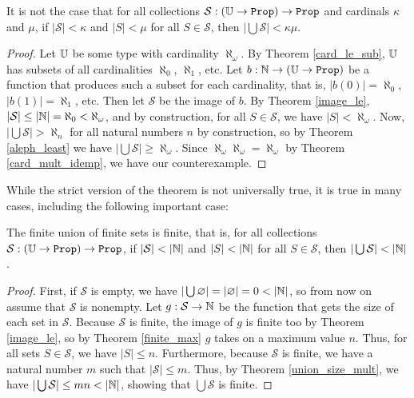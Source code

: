 \documentclass[../../math.tex]{subfiles}
\begin{document}
\begin{theorem}
    It is not the case that for all collections $\mathcal S : (\U \to \Prop) \to
    \Prop$ and cardinals $\kappa$ and $\mu$, if $|\mathcal S| < \kappa$ and $|S|
    < \mu$ for all $S \in \mathcal S$, then $|\bigcup \mathcal S| < \kappa\mu$.
\end{theorem}
\begin{proof}
    Let $\mathbb{U}$ be some type with cardinality $\aleph_\omega$.  By Theorem
    \ref{card_le_sub}, $\mathbb{U}$ has subsets of all cardinalities $\aleph_0$,
    $\aleph_1$, etc.  Let $b : \N \to (\U \to \Prop)$ be a function that
    produces such a subset for each cardinality, that is, $|b(0)| = \aleph_0$,
    $|b(1)| = \aleph_1$, etc.  Then let $\mathcal S$ be the image of $b$.  By
    Theorem \ref{image_le}, $|\mathcal S| \leq |\mathbb{N}| = \aleph_0 < \aleph_\omega$,
    and by construction, for all $S \in \mathcal S$, we have $|S| <
    \aleph_\omega$.  Now, $|\bigcup \mathcal S| > \aleph_n$ for all natural
    numbers $n$ by construction, so by Theorem \ref{aleph_least} we have
    $|\bigcup \mathcal S| \geq \aleph_\omega$.  Since $\aleph_\omega
    \aleph_\omega = \aleph_\omega$ by Theorem \ref{card_mult_idemp}, we have our
    counterexample.
\end{proof}

While the strict version of the theorem is not universally true, it is true in
many cases, including the following important case:

\begin{theorem} \label{finite_union_finite}
    The finite union of finite sets is finite, that is, for all collections
    $\mathcal S : (\U \to \Prop) \to \Prop$, if $|\mathcal S| < |\mathbb{N}|$ and $|S| <
    |\mathbb{N}|$ for all $S \in \mathcal S$, then $|\bigcup \mathcal S| < |\mathbb{N}|$.
\end{theorem}
\begin{proof}
    First, if $\mathcal S$ is empty, we have $|\bigcup \varnothing| =
    |\varnothing| = 0 < |\mathbb{N}|$, so from now on assume that $\mathcal S$ is
    nonempty.  Let $g : \mathcal S \to \mathbb{N}$ be the function that gets the size of
    each set in $\mathcal S$.  Because $\mathcal S$ is finite, the image of $g$
    is finite too by Theorem \ref{image_le}, so by Theorem \ref{finite_max} $g$
    takes on a maximum value $n$.  Thus, for all sets $S \in \mathcal S$, we
    have $|S| \leq n$.  Furthermore, because $\mathcal S$ is finite, we have a
    natural number $m$ such that $|\mathcal S| \leq m$.  Thus, by Theorem
    \ref{union_size_mult}, we have $|\bigcup \mathcal S| \leq mn < |\mathbb{N}|$,
    showing that $\bigcup \mathcal S$ is finite.
\end{proof}
\end{document}
